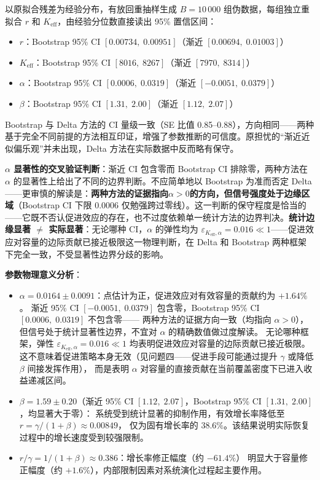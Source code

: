 \documentclass[12pt,a4paper]{ctexart}
\begin{document}
以原拟合残差为经验分布，有放回重抽样生成 $B=10\,000$ 组伪数据，每组独立重拟合 $r$ 和 $K_{\text{eff}}$，由经验分位数直接读出 95\% 置信区间：
\begin{itemize}
  \item $r$：Bootstrap 95\% CI $[0.00734,\;0.00951]$（渐近 $[0.00694,\;0.01003]$）
  \item $K_{\text{eff}}$：Bootstrap 95\% CI $[8016,\;8267]$（渐近 $[7970,\;8314]$）
  \item $\alpha$：Bootstrap 95\% CI $[0.0006,\;0.0319]$（渐近 $[-0.0051,\;0.0379]$）
  \item $\beta$：Bootstrap 95\% CI $[1.31,\;2.00]$（渐近 $[1.12,\;2.07]$）
\end{itemize}
Bootstrap 与 Delta 方法的 CI 量级一致（SE 比值 0.85--0.88），方向相同——两种基于完全不同前提的方法相互印证，增强了参数推断的可信度。原担忧的``渐近近似偏乐观''并未出现，Delta 方法在实际数据中反而略有保守。

\textbf{$\alpha$ 显著性的交叉验证判断}：渐近 CI 包含零而 Bootstrap CI 排除零，两种方法在 $\alpha$ 的显著性上给出了不同的边界判断。不应简单地以 Bootstrap 为准而否定 Delta——更审慎的解读是：\textbf{两种方法的证据指向$\alpha > 0$的方向，但信号强度处于边缘区域}（Bootstrap CI 下限 $0.0006$ 仅勉强跨过零线）。这一判断的保守程度是恰当的——它既不否认促进效应的存在，也不过度依赖单一统计方法的边界判决。\textbf{统计边缘显著 $\neq$ 实际显著}：无论哪种 CI，$\alpha$ 的弹性均为 $\varepsilon_{K_{\text{eff}},\alpha}=0.016 \ll 1$——促进效应对容量的边际贡献已接近极限这一物理判断，在 Delta 和 Bootstrap 两种框架下完全一致，不受显著性边界分歧的影响。

\textbf{参数物理意义分析}：
\begin{itemize}
  \item $\alpha = 0.0164 \pm 0.0091$：点估计为正，促进效应对有效容量的贡献约为 $+1.64\%$。
  渐近 95\% CI $[-0.0051,\;0.0379]$ 包含零，Bootstrap 95\% CI $[0.0006,\;0.0319]$ 不包含零——
  两种方法的证据方向一致（均指向 $\alpha > 0$），但信号处于统计显著性边界，不宜对 $\alpha$ 的精确数值做过度解读。
  无论哪种框架，弹性 $\varepsilon_{K_{\text{eff}},\alpha}=0.016 \ll 1$ 均表明促进效应对容量的边际贡献已接近极限。
  这不意味着促进策略本身无效（见问题四——促进手段可能通过提升 $\gamma$ 或降低 $\beta$ 间接发挥作用），
  而是表明 $\alpha$ 对容量的直接贡献在当前覆盖密度下已进入收益递减区间。
  \item $\beta = 1.59 \pm 0.20$（渐近 95\% CI $[1.12,\;2.07]$，Bootstrap 95\% CI $[1.31,\;2.00]$，均显著大于零）：
  系统受到统计显著的抑制作用，有效增长率降低至 $r = \gamma/(1+\beta) \approx 0.00849$，
  仅为固有增长率的 $38.6\%$。该结果说明实际恢复过程中的增长速度受到较强限制。
  \item $r/\gamma = 1/(1+\beta) \approx 0.386$：增长率修正幅度（约 $-61.4\%$）
  明显大于容量修正幅度（约 $+1.6\%$），内部限制因素对系统演化过程起主要作用。
\end{itemize}
\end{document}

